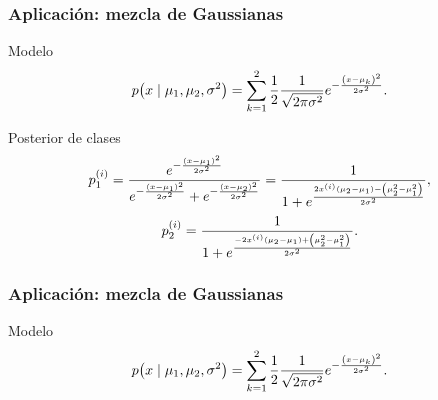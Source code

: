 \documentclass[table]{beamer}
\begin{document}
\begin{frame}
    \frametitle{Aplicación: mezcla de Gaussianas}
    \begin{exampleblock}{Modelo}
        \begin{equation*}
            \pdf{x \mid \mu_{1} , \mu_{2} , \sigma^{2}} = \sum_{k = 1}^{2} \frac{1}{2} \frac{1}{\sqrt{2 \pi \sigma^{2}}} e^{- \frac{\parens{x - \mu_{k}}^{2}}{2 \sigma^{2}}} .
        \end{equation*}
    \end{exampleblock}
    \begin{block}{Posterior de clases}
        \begin{equation*}
            p^{\parens{i}}_{1}%
            = \frac{e^{- \frac{\parens{x - \mu_{1}}^{2}}{2 \sigma^{2}}}}{e^{- \frac{\parens{x - \mu_{1}}^{2}}{2 \sigma^{2}}} + e^{- \frac{\parens{x - \mu_{2}}^{2}}{2 \sigma^{2}}}}
            = \frac{1}{1 + e^{\frac{2 x^{\parens{i}} \parens{\mu_{2} - \mu_{1}} - \parens{\mu_{2}^{2} - \mu_{1}^{2}}}{2 \sigma^{2}}}} ,
        \end{equation*}
        \begin{equation*}
            p^{\parens{i}}_{2}%
            = \frac{1}{1 + e^{\frac{- 2 x^{\parens{i}} \parens{\mu_{2} - \mu_{1}} + \parens{\mu_{2}^{2} - \mu_{1}^{2}}}{2 \sigma^{2}}}} .
        \end{equation*}
    \end{block}
\end{frame}

\begin{frame}
    \frametitle{Aplicación: mezcla de Gaussianas}
    \begin{exampleblock}{Modelo}
        \begin{equation*}
            \pdf{x \mid \mu_{1} , \mu_{2} , \sigma^{2}} = \sum_{k = 1}^{2} \frac{1}{2} \frac{1}{\sqrt{2 \pi \sigma^{2}}} e^{- \frac{\parens{x - \mu_{k}}^{2}}{2 \sigma^{2}}} .
        \end{equation*}
    \end{exampleblock}
    
\end{frame}
\end{document}
